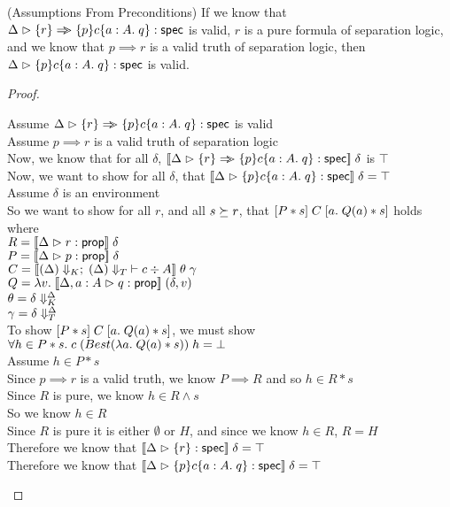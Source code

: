 \begin{lemma}{(Assumptions From Preconditions)}
If we know that $\judgeS{\setof{r} \specimp \spec{p}{c}{a:A}{q}}$ is
valid, $r$ is a pure formula of separation logic, and we know that $p
\implies r$ is a valid truth of separation logic, then
$\judgeS{\spec{p}{c}{a:A}{q}}$ is valid.
\end{lemma}

\begin{proof}
  \begin{tabbedproof}
    \oo Assume $\judgeS{\setof{r} \specimp \spec{p}{c}{a:A}{q}}$ is valid \\
    \oo Assume $p \implies r$ is a valid truth of separation logic \\
    \ooo Now, we know that for all $\delta$, $\interp{\judgeS{\setof{r} \specimp \spec{p}{c}{a:A}{q}}}\;\delta$ is $\top$\\
    \ooo Now, we want to show for all $\delta$, that $\interp{\judgeS{\spec{p}{c}{a:A}{q}}}\;\delta = \top$ \\
    \ooo Assume $\delta$ is an environment \\
    \oooo So we want to show for all $r$, and all $s \worldgeq r$, that $\basicspec{P*s}{C}{a}{Q(a) * s}$ holds\\
    \ooox where \\
    \oooox $R = \interp{\judgeA{r}{\assert}}\;\delta$ \\
    \oooox $P = \interp{\judgeA{p}{\assert}}\;\delta$ \\
    \oooox $C = \interp{\judgeC[\restrictkind{\Delta}]{\restricttype{\Delta}}{c}{A}}\;\theta\;\gamma$ \\
    \oooox $Q = \semfun{v}{\interp{\judgeA[\Delta,a:A]{q}{\assert}}\;(\delta,v)}$ \\
    \oooox $\theta = \restricttyenv{\Delta}{\delta}$ \\
    \oooox $\gamma = \restrictvals{\Delta}{\delta}$ \\
    \oooo To show $\basicspec{P*s}{C}{a}{Q(a)*s}$, we must show 
          $\forall h \in P * s.\; c\; (Best(\semfun{a}{Q(a)*s}))\;h = \bot$ \\
    \oooo Assume $h \in P * s$ \\
    \ooooo Since $p \implies r$ is a valid truth, we know $P \implies R$ and so $h \in R * s$ \\
    \ooooo Since $R$ is pure, we know $h \in R \land s$ \\
    \ooooo So we know $h \in R$ \\
    \ooooo Since $R$ is pure it is either $\emptyset$ or $H$, and since we know $h \in R$, $R = H$ \\
    \ooooo Therefore we know that $\interp{\judgeS{\setof{r}}}\;\delta = \top$ \\
    \ooooo Therefore we know that $\interp{\judgeS{\spec{p}{c}{a:A}{q}}}\;\delta = \top$ \\
  \end{tabbedproof}
\end{proof}


